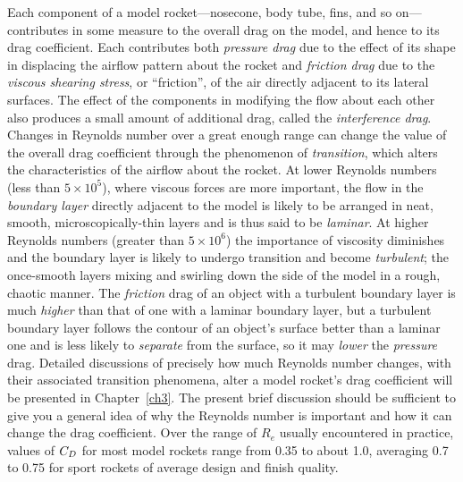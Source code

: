 Each component of a model rocket---nosecone, body tube, fins, and so
on---contributes in some measure to the overall drag on the model, and hence to
its drag coefficient. Each contributes both \emph{pressure drag} due to the
effect of its shape in displacing the airflow pattern about the rocket and
\emph{friction drag} due to the \emph{viscous shearing stress}, or
``friction'', of the air directly adjacent to its lateral surfaces. The effect
of the components in modifying the flow about each other also produces a small
amount of additional drag, called the \emph{interference drag}. Changes in
Reynolds number over a great enough range can change the value of the overall
drag coefficient through the phenomenon of \emph{transition}, which alters the
characteristics of the airflow about the rocket. At lower Reynolds numbers
(less than $5 \times 10^{5}$), where viscous forces are more important, the
flow in the \emph{boundary layer} directly adjacent to the model is likely to
be arranged in neat, smooth, microscopically-thin layers and is thus said to be
\emph{laminar}. At higher Reynolds numbers (greater than $5 \times 10^{6}$) the
importance of viscosity diminishes and the boundary layer is likely to undergo
transition and become \emph{turbulent}; the once-smooth layers mixing and
swirling down the side of the model in a rough, chaotic manner. The
\emph{friction} drag of an object with a turbulent boundary layer is much
\emph{higher} than that of one with a laminar boundary layer, but a turbulent
boundary layer follows the contour of an object's surface better than a laminar
one and is less likely to \emph{separate} from the surface, so it may
\emph{lower} the \emph{pressure} drag. Detailed discussions of precisely how
much Reynolds number changes, with their associated transition phenomena, alter
a model rocket's drag coefficient will be presented in Chapter~\ref{ch3}. The
present brief discussion should be sufficient to give you a general idea of why
the Reynolds number is important and how it can change the drag coefficient.
Over the range of $R_e$ usually encountered in practice, values of $C_{D}$ for
most model rockets range from 0.35 to about 1.0, averaging 0.7 to 0.75 for
sport rockets of average design and finish quality.

